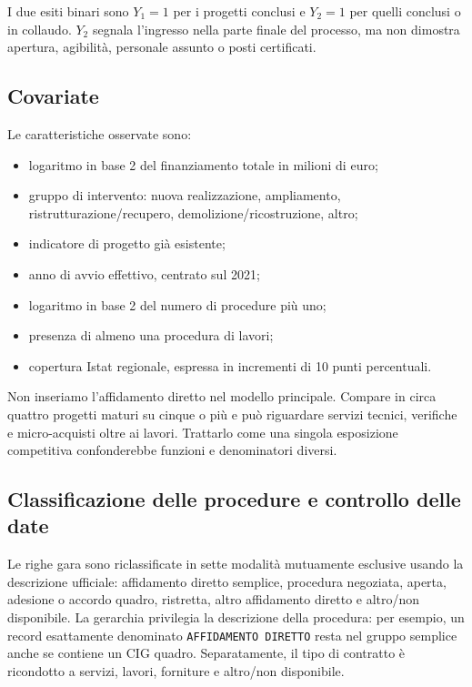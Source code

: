 \documentclass[10pt,a4paper]{article}
\begin{document}
I due esiti binari sono $Y_1=1$ per i progetti conclusi e $Y_2=1$ per quelli conclusi o in collaudo. $Y_2$ segnala l'ingresso nella parte finale del processo, ma non dimostra apertura, agibilità, personale assunto o posti certificati.

\subsection{Covariate}

Le caratteristiche osservate sono:

\begin{itemize}
  \item logaritmo in base 2 del finanziamento totale in milioni di euro;
  \item gruppo di intervento: nuova realizzazione, ampliamento, ristrutturazione/\allowbreak{}recupero, demolizione/\allowbreak{}ricostruzione, altro;
  \item indicatore di progetto già esistente;
  \item anno di avvio effettivo, centrato sul 2021;
  \item logaritmo in base 2 del numero di procedure più uno;
  \item presenza di almeno una procedura di lavori;
  \item copertura Istat regionale, espressa in incrementi di 10 punti percentuali.
\end{itemize}

Non inseriamo l'affidamento diretto nel modello principale. Compare in circa quattro progetti maturi su cinque o più e può riguardare servizi tecnici, verifiche e micro-acquisti oltre ai lavori. Trattarlo come una singola esposizione competitiva confonderebbe funzioni e denominatori diversi.

\subsection{Classificazione delle procedure e controllo delle date}

Le righe gara sono riclassificate in sette modalità mutuamente esclusive usando la descrizione ufficiale: affidamento diretto semplice, procedura negoziata, aperta, adesione o accordo quadro, ristretta, altro affidamento diretto e altro/non disponibile. La gerarchia privilegia la descrizione della procedura: per esempio, un record esattamente denominato \texttt{AFFIDAMENTO DIRETTO} resta nel gruppo semplice anche se contiene un CIG quadro. Separatamente, il tipo di contratto è ricondotto a servizi, lavori, forniture e altro/non disponibile.
\end{document}
